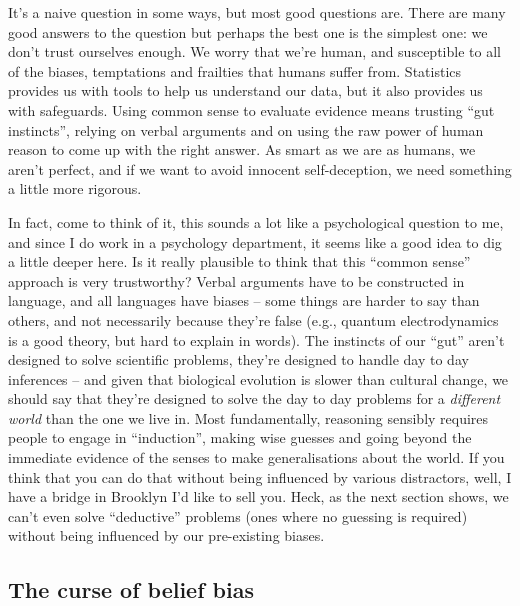 \documentclass[]{book}
\begin{document}
It's a naive question in some ways, but most good questions are. There are many good answers to the question but perhaps the best one is the simplest one: we don't trust ourselves enough. We worry that we're human, and susceptible to all of the biases, temptations and frailties that humans suffer from. Statistics provides us with tools to help us understand our data, but it also provides us with safeguards. Using common sense to evaluate evidence means trusting ``gut instincts'', relying on verbal arguments and on using the raw power of human reason to come up with the right answer. As smart as we are as humans, we aren't perfect, and if we want to avoid innocent self-deception, we need something a little more rigorous.

In fact, come to think of it, this sounds a lot like a psychological question to me, and since I do work in a psychology department, it seems like a good idea to dig a little deeper here. Is it really plausible to think that this ``common sense'' approach is very trustworthy? Verbal arguments have to be constructed in language, and all languages have biases -- some things are harder to say than others, and not necessarily because they're false (e.g., quantum electrodynamics is a good theory, but hard to explain in words). The instincts of our ``gut'' aren't designed to solve scientific problems, they're designed to handle day to day inferences -- and given that biological evolution is slower than cultural change, we should say that they're designed to solve the day to day problems for a \emph{different world} than the one we live in. Most fundamentally, reasoning sensibly requires people to engage in ``induction'', making wise guesses and going beyond the immediate evidence of the senses to make generalisations about the world. If you think that you can do that without being influenced by various distractors, well, I have a bridge in Brooklyn I'd like to sell you. Heck, as the next section shows, we can't even solve ``deductive'' problems (ones where no guessing is required) without being influenced by our pre-existing biases.

\hypertarget{the-curse-of-belief-bias}{%
\subsection{The curse of belief bias}\label{the-curse-of-belief-bias}}
\end{document}
